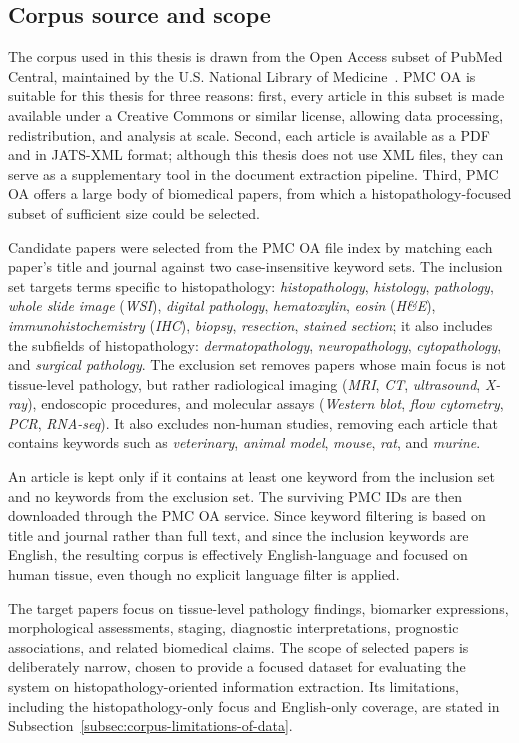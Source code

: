 \subsection{Corpus source and scope}\label{subsec:corpus-source-and-scope}

The corpus used in this thesis is drawn from the Open Access subset of PubMed Central, maintained by the U.S. National Library of Medicine~\parencite{nlm_pmc_open_access}. PMC OA is suitable for this thesis for three reasons: first, every article in this subset is made available under a Creative Commons or similar license, allowing data processing, redistribution, and analysis at scale. Second, each article is available as a PDF and in JATS-XML format; although this thesis does not use XML files, they can serve as a supplementary tool in the document extraction pipeline. Third, PMC OA offers a large body of biomedical papers, from which a histopathology-focused subset of sufficient size could be selected. 

Candidate papers were selected from the PMC OA file index by matching each paper's title and journal against two case-insensitive keyword sets. The inclusion set targets terms specific to histopathology: \emph{histopathology}, \emph{histology}, \emph{pathology}, \emph{whole slide image} (\emph{WSI}), \emph{digital pathology}, \emph{hematoxylin}, \emph{eosin} (\emph{H\&E}), \emph{immunohistochemistry} (\emph{IHC}), \emph{biopsy}, \emph{resection}, \emph{stained section}; it also includes the subfields of histopathology: \emph{dermatopathology}, \emph{neuropathology}, \emph{cytopathology}, and \emph{surgical pathology}. The exclusion set removes papers whose main focus is not tissue-level pathology, but rather radiological imaging (\emph{MRI}, \emph{CT}, \emph{ultrasound}, \emph{X-ray}), endoscopic procedures, and molecular assays (\emph{Western blot}, \emph{flow cytometry}, \emph{PCR}, \emph{RNA-seq}). It also excludes non-human studies, removing each article that contains keywords such as \emph{veterinary}, \emph{animal model}, \emph{mouse}, \emph{rat}, and \emph{murine}. 

An article is kept only if it contains at least one keyword from the inclusion set and no keywords from the exclusion set. The surviving PMC IDs are then downloaded through the PMC OA service. Since keyword filtering is based on title and journal rather than full text, and since the inclusion keywords are English, the resulting corpus is effectively English-language and focused on human tissue, even though no explicit language filter is applied.

The target papers focus on tissue-level pathology findings, biomarker expressions, morphological assessments, staging, diagnostic interpretations, prognostic associations, and related biomedical claims. The scope of selected papers is deliberately narrow, chosen to provide a focused dataset for evaluating the system on histopathology-oriented information extraction. Its limitations, including the histopathology-only focus and English-only coverage, are stated in Subsection~\ref{subsec:corpus-limitations-of-data}.